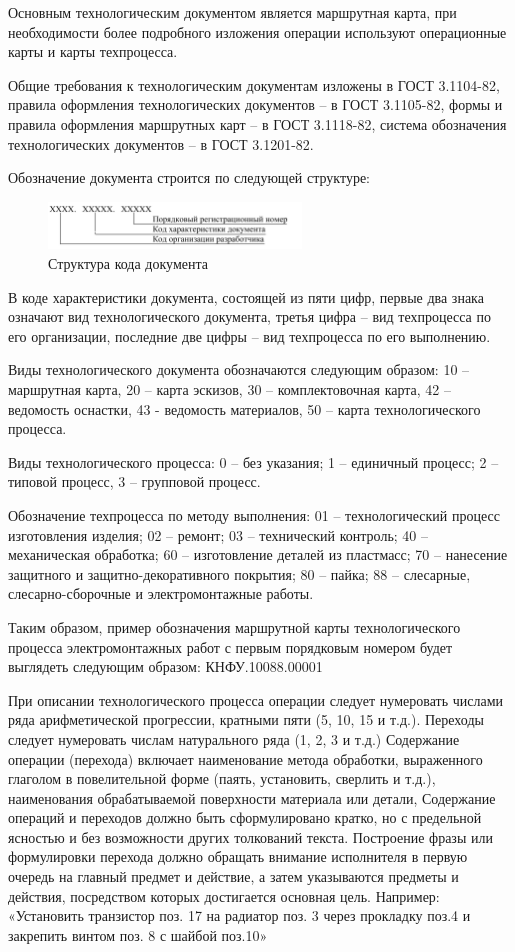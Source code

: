 \documentclass[unicode, 12pt, a4paper, oneside]{article}
\begin{document}
Основным технологическим документом является маршрутная карта,  при необходимости более подробного изложения операции используют операционные карты и карты техпроцесса.

Общие требования к технологическим документам изложены в ГОСТ 3.1104-82, правила оформления технологических документов – в ГОСТ 3.1105-82, формы и правила оформления маршрутных карт – в ГОСТ 3.1118-82, система обозначения технологических документов – в ГОСТ 3.1201-82.

Обозначение документа строится по следующей структуре:

\begin{figure}[htbp]
\centering
\includegraphics[width=0.6\textwidth]{83_code.png}
\caption{Структура кода документа}
\label{fig:83_code}
\end{figure}

В коде характеристики документа, состоящей из пяти цифр, первые два знака означают вид технологического документа, третья цифра – вид техпроцесса по его организации, последние две цифры – вид техпроцесса по его выполнению.

Виды технологического документа обозначаются следующим образом: 10 – маршрутная карта, 20 – карта эскизов, 30 – комплектовочная карта, 42 – ведомость оснастки, 43 -  ведомость материалов, 50 – карта технологического процесса.

Виды технологического процесса: 0 – без указания; 1 – единичный процесс; 2 – типовой процесс, 3 – групповой процесс.

Обозначение техпроцесса по методу выполнения: 01 – технологический процесс изготовления изделия; 02 – ремонт; 03 – технический контроль; 40 – механическая обработка; 60 – изготовление деталей из пластмасс; 70 – нанесение защитного и защитно-декоративного покрытия; 80 – пайка; 88 – слесарные, слесарно-сборочные и электромонтажные работы.

Таким образом, пример обозначения маршрутной карты технологического процесса электромонтажных работ с первым порядковым номером будет выглядеть следующим образом: КНФУ.10088.00001

При описании технологического процесса операции следует нумеровать числами ряда арифметической прогрессии, кратными пяти (5, 10, 15 и т.д.). Переходы следует нумеровать числам натурального ряда (1, 2, 3 и т.д.) Содержание операции (перехода) включает наименование метода  обработки, выраженного глаголом в повелительной форме (паять, установить, сверлить и т.д.), наименования обрабатываемой поверхности материала или детали,  Содержание операций и переходов должно быть сформулировано кратко, но с предельной ясностью и без возможности других толкований текста. Построение фразы или формулировки перехода должно обращать внимание исполнителя в первую очередь на главный предмет и действие, а затем указываются предметы и действия, посредством которых достигается основная цель. Например: «Установить транзистор поз. 17 на радиатор поз. 3 через прокладку поз.4 и закрепить винтом поз. 8 с шайбой поз.10»
\end{document}
